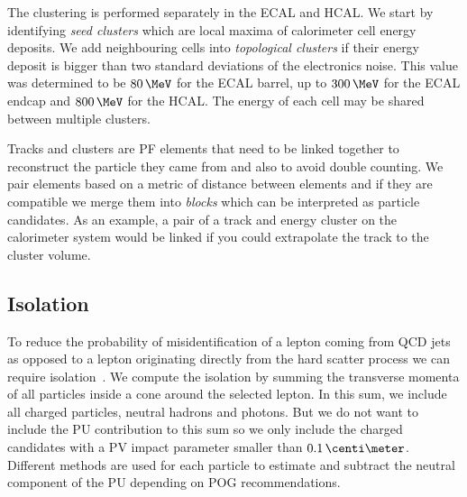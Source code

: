 The clustering is performed separately in the \gls{ECAL} and \gls{HCAL}. We start by identifying \textit{seed clusters} which are local maxima of calorimeter cell energy deposits. We add neighbouring cells into \textit{topological clusters} if their energy deposit is bigger than two standard deviations of the electronics noise. This value was determined to be $80\,\MeV$ for the \gls{ECAL} barrel, up to $300\,\MeV$ for the \gls{ECAL} endcap and $800\,\MeV$ for the \gls{HCAL}. The energy of each cell may be shared between multiple clusters.

Tracks and clusters are \gls{PF} elements that need to be linked together to reconstruct the particle they came from and also to avoid double counting. We pair elements based on a metric of distance between elements and if they are compatible we merge them into \textit{blocks} which can be interpreted as particle candidates. As an example, a pair of a track and energy cluster on the calorimeter system would be linked if you could extrapolate the track to the cluster volume.


\subsection{Isolation}
\label{SUBSECTION:EventReconstructionAndSimulation_ParticleFlow_LeptonIsolation}


To reduce the probability of misidentification of a lepton coming from \gls{QCD} jets as opposed to a lepton originating directly from the hard scatter process we can require isolation~\cite{ARTICLE:CMSElectronReconstruction8TeV, ARTICLE:CMSMuonReconstruction7TeV}. We compute the isolation by summing the transverse momenta of all particles inside a cone around the selected lepton. In this sum, we include all charged particles, neutral hadrons and photons. But we do not want to include the \gls{PU} contribution to this sum so we only include the charged candidates with a \gls{PV} impact parameter smaller than $0.1 \,\centi\meter$. Different methods are used for each particle to estimate and subtract the neutral component of the \gls{PU} depending on \gls{POG} recommendations.

